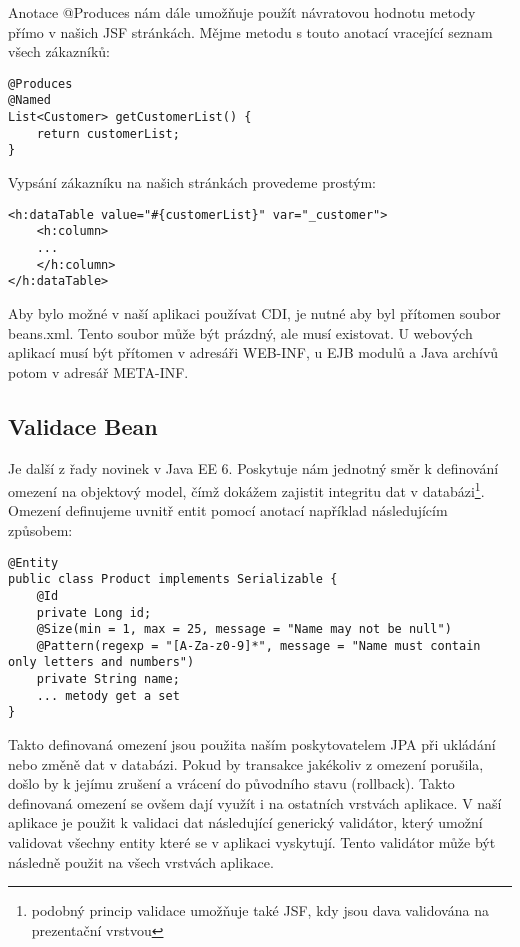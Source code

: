 \documentclass[122pt,oneside]{fithesis}
\begin{document}
Anotace @Produces nám dále umožňuje použít návratovou hodnotu metody přímo v našich JSF stránkách. Mějme metodu s touto anotací vracející seznam všech zákazníků:

\begin{lstlisting}
@Produces
@Named
List<Customer> getCustomerList() {
	return customerList;
}
\end{lstlisting}

Vypsání zákazníku na našich stránkách provedeme prostým:

\begin{lstlisting}
<h:dataTable value="#{customerList}" var="_customer">
	<h:column>
	...
	</h:column>
</h:dataTable>
\end{lstlisting}

Aby bylo možné v naší aplikaci používat CDI, je nutné aby byl přítomen soubor beans.xml. Tento soubor může být prázdný, ale musí existovat. U webových aplikací musí být přítomen v adresáři WEB-INF, u EJB modulů a Java archívů potom v adresář META-INF.

\subsection{Validace Bean}
Je další z řady novinek v Java EE 6. Poskytuje nám jednotný směr k definování omezení na objektový model, čímž dokážem zajistit integritu dat v databázi\footnote[1]{podobný princip validace umožňuje také JSF, kdy jsou dava validována na prezentační vrstvou}. Omezení definujeme uvnitř entit pomocí anotací například následujícím způsobem:

\begin{lstlisting}
@Entity
public class Product implements Serializable {
	@Id
	private Long id;
	@Size(min = 1, max = 25, message = "Name may not be null")
	@Pattern(regexp = "[A-Za-z0-9]*", message = "Name must contain only letters and numbers")
	private String name;
	... metody get a set
}
\end{lstlisting}

Takto definovaná omezení jsou použita naším poskytovatelem JPA při ukládání nebo změně dat v databázi. Pokud by transakce jakékoliv z omezení porušila, došlo by k jejímu zrušení a vrácení do původního stavu (rollback). Takto definovaná omezení se ovšem dají využít i na ostatních vrstvách aplikace. V naší aplikace je použit k validaci dat následující generický validátor, který umožní validovat všechny entity které se v aplikaci vyskytují. Tento validátor může být následně použit na všech vrstvách aplikace.
\end{document}
